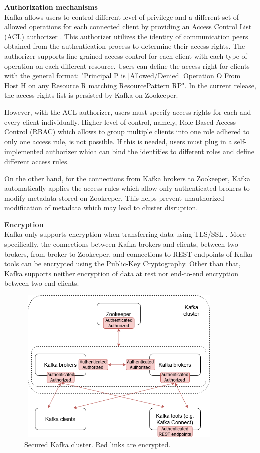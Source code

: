 \textbf{Authorization mechanisms}\\
Kafka allows users to control different level of privilege and a different set of allowed operations for each connected client by providing an Access Control List (ACL) authorizer \cite{kafkasecurity}. This authorizer utilizes the identity of communication peers obtained from the authentication process to determine their access rights. The authorizer supports fine-grained access control for each client with each type of operation on each different resource. Users can define the access right for clients with the general format: "Principal P is [Allowed/Denied] Operation O From Host H on any Resource R matching ResourcePattern RP". In the current release, the access rights list is persisted by Kafka on Zookeeper. 

However, with the ACL authorizer, users must specify access rights for each and every client individually. Higher level of control, namely, Role-Based Access Control (RBAC) which allows to group multiple clients into one role adhered to only one access rule, is not possible. If this is needed, users must plug in a self-implemented authorizer which can bind the identities to different roles and define different access rules. 

On the other hand, for the connections from Kafka brokers to Zookeeper, Kafka automatically applies the access rules which allow only authenticated brokers to modify metadata stored on Zookeeper. This helps prevent unauthorized modification of metadata which may lead to cluster disruption.

\textbf{Encryption}\\
Kafka only supports encryption when transferring data using TLS/SSL \cite{kafkasecurity}. More specifically, the connections between Kafka brokers and clients, between two brokers, from broker to Zookeeper, and connections to REST endpoints of Kafka tools can be encrypted using the Public-Key Cryptography. Other than that, Kafka supports neither encryption of data at rest nor end-to-end encryption between two end clients.  

\begin{figure}[h]
	\centering
	\includegraphics[width=10cm,height=7.5cm]{images/security-kafka.png}
	\caption{Secured Kafka cluster. Red links are encrypted.}
	\label{fig:securitykafka}
\end{figure}

